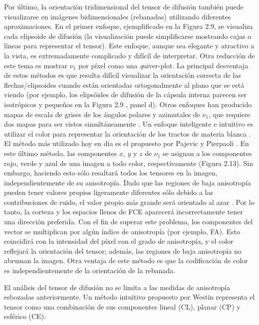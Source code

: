 Por último, la orientación tridimensional del tensor de difusión también puede visualizarse en imágenes bidimensionales (rebanadas) utilizando diferentes aproximaciones. En el primer enfoque, ejemplificado en la Figura 2.9, se visualiza cada elipsoide de difusión (la visualización puede simplificarse mostrando cajas o líneas para representar el tensor). Este enfoque, aunque sea elegante y atractivo a la vista, es extremadamente complicado y difícil de interpretar. Otra reducción de este tema es mostrar $\nu_1$ por píxel como una {\emph quiver-plot}. La principal desventaja de estos métodos es que resulta difícil visualizar la orientación correcta de las flechas/elipsoides cuando están orientadas ortogonalmente al plano que se está viendo (por ejemplo, los elipsóides de difusión de la cápsula interna parecen ser isotrópicos y pequeños en la Figura 2.9 , panel d). Otros enfoques han producido mapas de escala de grises de los ángulos polares y azimutales de $\nu_1$, que requiere dos mapas para ser vistos simultáneamente \cite{Conturo_1996,Ulug_1994}. Un enfoque inteligente e intuitivo es utilizar el color para representar la orientación de los tractos de materia blanca \cite{Douek_1991,Jones_1997,Coremans_1994,Nakada_1995,Pierpaoli_1997,Jones_1997}. El método más utilizado hoy en día es el propuesto por Pajevic y Pierpaoli \cite{Pajevic_2000}. En este último método, las componentes $x$, $y$ y $z$ de $\nu_1$ se asignan a los componentes rojo, verde y azul de una imagen a todo color, respectivamente (Figura 2.13). Sin embargo, haciendo esto sólo resaltará todos los tensores en la imagen, independientemente de su anisotropía. Dado que las regiones de baja anisotropía pueden tener valores propios ligeramente diferentes sólo debido a las contribuciones de ruido, el valor propio más grande será orientado al azar \cite{Bastin_1998}. Por lo tanto, la corteza y los espacios llenos de FCE aparecerá incorrectamente tener una dirección preferida. Con el fin de superar este problema, los componentes del vector se multiplican por algún índice de anisotropía (por ejemplo, FA). Esto coincidirá con la intensidad del píxel con el grado de anisotropía, y el color reflejará la orientación del tensor; además, las regiones de baja anisotropía no abruman la imagen. Otra ventaja de este método es que la codificación de color es independientemente de la orientación de la rebanada.

El análisis del tensor de difusión no se limita a las medidas de anisotropía esbozadas anteriormente. Un método intuitivo propuesto por Westin \cite{Westin_1997} representa el tensor como una combinación de sus componentes lineal (CL), planar (CP) y esférico (CE):

